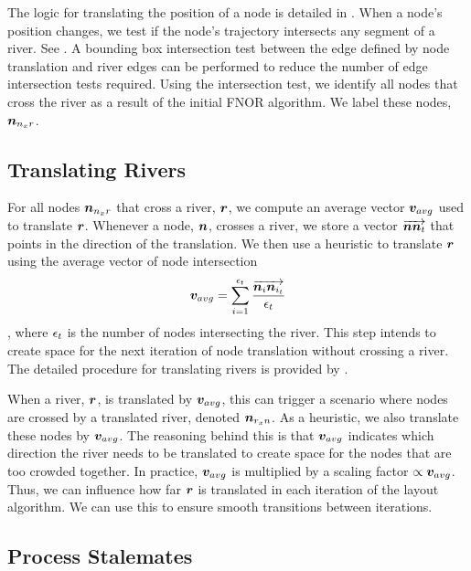 The logic for translating the position of a node is detailed in . When a node's position changes, we test if the node's trajectory intersects any segment of a river. See . A bounding box intersection test between the edge defined by node translation and river edges can be performed to reduce the number of edge intersection tests required. Using the intersection test, we identify all nodes that cross the river as a result of the initial FNOR algorithm. We label these nodes, $ \bm{n}_{n_{x}r} $.

\subsection{Translating Rivers}
\label{subsec:{Translating Rivers}}

For all nodes $ \bm{n}_{n_{x}r} $ that cross a river, $ \bm{r} $, we compute an average vector $ \bm{v}_{avg} $ used to translate $ \bm{r} $. Whenever a node, $ \bm{n} $, crosses a river, we store a vector $ \protect\overrightarrow{\bm{n}\bm{n}_{t}} $ that points in the direction of the translation. We then use a heuristic to translate $ \bm{r} $ using the average vector of node intersection $$ \bm{v}_{avg} = \sum_{i=1}^{\epsilon_{t}} \frac{\protect\overrightarrow{\bm{n}_i\bm{n}_{i_t}}}{\epsilon_{t}} $$, where $ \epsilon_{t} $ is the number of nodes intersecting the river. This step intends to create space for the next iteration of node translation without crossing a river. The detailed procedure for translating rivers is provided by .


When a river, $ \bm{r} $, is translated by $ \bm{v}_{avg} $, this can trigger a scenario where nodes are crossed by a translated river, denoted $ \bm{n}_{r_{x}n} $. As a heuristic, we also translate these nodes by $ \bm{v}_{avg} $. The reasoning behind this is that $ \bm{v}_{avg} $ indicates which direction the river needs to be translated to create space for the nodes that are too crowded together. In practice, $ \bm{v}_{avg} $ is multiplied by a scaling factor $ \propto\bm{v}_{avg} $. Thus, we can influence how far $ \bm{r} $ is translated in each iteration of the layout algorithm. We can use this to ensure smooth transitions between iterations.

\subsection{Process Stalemates}
\label{subsec:{Process Stalemates}}

